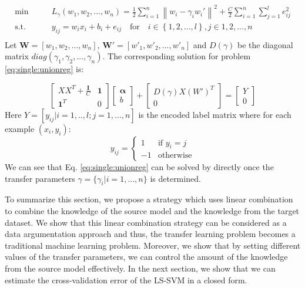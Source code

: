 \begin{equation}\label{eq:single:unionreg}
\begin{aligned}
\min \qquad& L_{\gamma}(w_1,w_2,...,w_n) = \frac{1}{2}\sum\limits_{i = 1}^n{\left\| {w_i}-\gamma_i w_i' \right\|^2} + \frac{C}{2}\sum\limits_{i = 1}^n\sum\limits_{j = 1}^l {{e_{ij} ^2}}\\
\text{s.t.}\qquad& {y_{ij}} = {w_i} {{x_i}} + b_i + {e _{ij}} \quad   \text{for} \quad i \in \left\{ {1,2,...,l}  \right\}, j \in {1,2,...,n}\\
\end{aligned}
\end{equation}
Let $\mathbf{W} = [w_1,w_2,...,w_n]$, $\mathbf{W'} = [w'_1,w'_2,...,w'_n]$ and $D(\gamma)$ be the diagonal matrix $diag(\gamma_1,\gamma_2,...,\gamma_n)$. The corresponding solution for problem \eqref{eq:single:unionreg} is:

\begin{equation}\label{eq:single:multisolu}
\left[\begin{array}{cc}
XX^T+\frac{\mathbf{I}}{C}&\mathbf{1}\\
\mathbf{1}^T&0
\end{array}\right]\left[\begin{array}{c} \mathbf{\alpha}\\b
\end{array}\right]+\left[\begin{array}{c}
D(\gamma)X(W')^T\\0
\end{array}\right] = \left[\begin{array}{c} Y\\0
\end{array}\right]
\end{equation} 
Here $Y = [y_{ij}|i=1,..,l; j=1,...,n]$ is the encoded label matrix where for each example $(x_i,y_i)$:
\begin{equation}\label{eq:single:labelmatrix}
	y_{ij}=
	\begin{cases}
	1 & \text{if } y_i=j\\
	-1 &\text{otherwise}
	\end{cases}
\end{equation}
We can see that Eq. \eqref{eq:single:unionreg} can be solved by directly once the transfer parameters $\gamma=\{\gamma_i|i=1,...,n\}$ is determined.

To summarize this section, we propose a strategy which uses linear combination to combine the knowledge of the source model and the knowledge from the target dataset. We show that this linear combination strategy can be considered as a data argumentation approach and thus, the transfer learning problem becomes a traditional machine learning problem. Moreover, we show that by setting different values of the transfer parameters, we can control the amount of the knowledge from the source model effectively. In the next section, we show that we can estimate the cross-validation error of the LS-SVM in a closed form.


